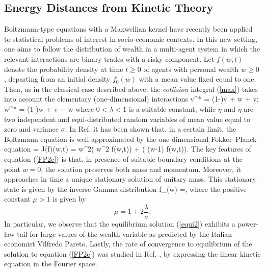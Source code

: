\documentclass{article}
\renewcommand{\ge}{\geqslant}
\newcommand{\fer}[1]{(\ref{#1})}
\def\be#1\ee{\begin{equation}#1\end{equation}}
\def\be#1\ee{\begin{equation}#1\end{equation}}
\begin{document}
\subsection{Energy Distances from Kinetic Theory}

% 
Boltzmann-type equations with a Maxwellian kernel have recently been applied to statistical problems of interest in socio-economic contexts.\cite{CoPaTo05}
% 
In this new setting, one aims to follow the distribution of wealth in a multi-agent system in which the relevant interactions are binary trades with a risky component. Let $f(w,t)$ denote the probability density at time $t \ge 0$ of agents with personal wealth $w\ge0$, departing from an initial density $f_0(w)$ with a mean value fixed equal to one. Then, as in the classical case described above, the \emph{collision} integral \fer{max} takes into account the elementary (one-dimensional) interactions 
\be\label{trade}
v^* = (1-\lambda)v + \lambda w + \eta v; \quad w^* = (1-\lambda)w + \lambda v + \tilde\eta w 
\ee
where $0<\lambda<1$ is a suitable constant, while $\eta$ and $\tilde\eta$ are two independent and equi-distributed random variables of mean value equal to zero and variance $\sigma$. In Ref. \cite{CoPaTo05} it has been shown that, in a certain limit, the Boltzmann equation is well approximated by the one-dimensional Fokker--Planck equation\cite{BM} 
 \be\label{FP2c}
  = J(f)(w,t) = \frac {}
{\partial w^2}\left( w^2 f(w,t)\right) + \lambda {}\left(
(w-1) f(w,t)\right).
\ee
 The key features of equation \fer{FP2c} is  that, in presence of suitable boundary conditions at the point $w=0$, the solution preserves both mass and momentum.
% 
Moreover, it approaches in time a unique stationary solution of unitary mass.\cite{TT1}
% 
This stationary state is given by the inverse Gamma distribution
 \be\label{equi2}
f_\infty(w) =,
 \ee
  where the positive constant $\mu >1$ is given by
\[
\mu = 1 + 2 \frac{\lambda}{\sigma}.
\]
% 
In particular, we observe that the equilibrium solution \fer{equi2} exhibits a power-law tail for large values of the wealth variable as predicted by the Italian economist Vilfredo Pareto.\cite{Par} 
% 
Lastly, the rate of convergence to equilibrium of the solution to equation \fer{FP2c} was studied in Ref. \cite{ToTo}, by expressing the linear kinetic equation in the Fourier space.
\end{document}
